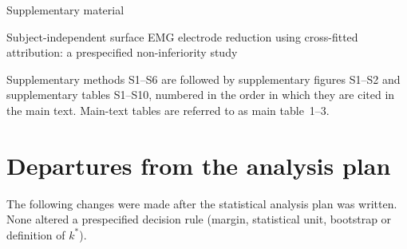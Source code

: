 \documentclass{iopjournal}
\begin{document}
{\noindent\fontsize{16}{19}\selectfont\sffamily Supplementary material\par}
\vspace{2mm}
{\noindent\large Subject-independent surface EMG electrode reduction using cross-fitted attribution: a prespecified non-inferiority study\par}
\vspace{6mm}

Supplementary methods S1--S6 are followed by supplementary figures S1--S2 and supplementary tables S1--S10, numbered in the order in which they are cited in the main text. Main-text tables are referred to as main table~1--3.

\section{Departures from the analysis plan}
\label{app:deviations}
The following changes were made after the statistical analysis plan was written. None altered a prespecified decision rule (margin, statistical unit, bootstrap or definition of $k^*$).
\end{document}
